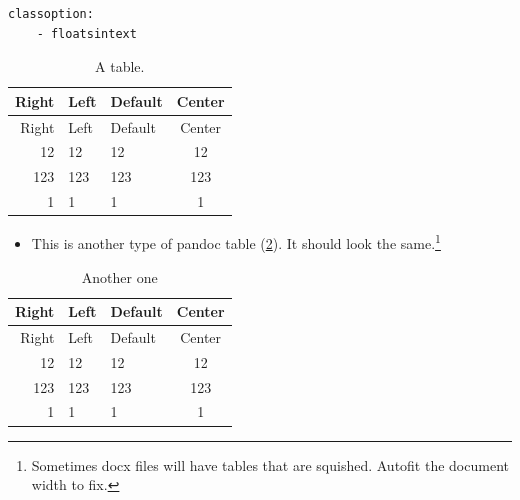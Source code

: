 \documentclass[doc,longtable]{apa6}
\let\tightlist\relax %
\begin{document}
\begin{verbatim}
classoption:
    - floatsintext
\end{verbatim}

\begin{longtable}[]{@{}rllc@{}}
\caption{A table. \label{tbl:mytable}}\tabularnewline
\toprule
Right & Left & Default & Center\tabularnewline
\midrule
\endfirsthead
\toprule
Right & Left & Default & Center\tabularnewline
\midrule
\endhead
12 & 12 & 12 & 12\tabularnewline
123 & 123 & 123 & 123\tabularnewline
1 & 1 & 1 & 1\tabularnewline
\bottomrule
\end{longtable}

\begin{itemize}
\tightlist
\item
  This is another type of pandoc table (\ref{tbl:anotherone}). It should look the same.\footnote{Sometimes docx files will have tables that are squished. Autofit the document width to fix.}
\end{itemize}

\begin{longtable}[]{@{}rllc@{}}
\caption{Another one \label{tbl:anotherone}}\tabularnewline
\toprule
Right & Left & Default & Center\tabularnewline
\midrule
\endfirsthead
\toprule
Right & Left & Default & Center\tabularnewline
\midrule
\endhead
12 & 12 & 12 & 12\tabularnewline
123 & 123 & 123 & 123\tabularnewline
1 & 1 & 1 & 1\tabularnewline
\bottomrule
\end{longtable}

\newpage
\end{document}
